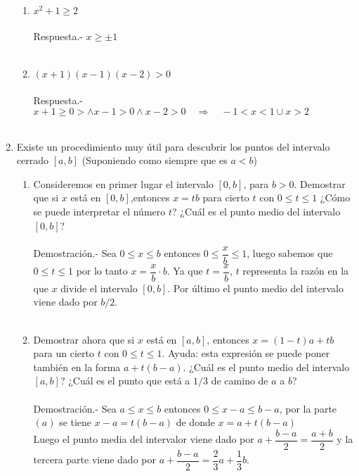 \begin{enumerate}
\begin{enumerate}[\bfseries (i)]
	\item $x^2+1 \geq 2$\\\\
	    Respuesta.-\; $x\geq \pm 1$\\\\

	\item $(x+1)(x-1)(x-2)>0$\\\\
	    Respuesta.-\; $x+1\geq 0 > \land x-1 > 0  \land x-2>0 \quad \Longrightarrow \quad -1<x<1 \cup x>2$\\\\

    \end{enumerate}

    \item Existe un procedimiento muy útil para descubrir los puntos del intervalo cerrado $[a,b]$ (Suponiendo como siempre que es $a<b$)
    \begin{enumerate}[\bfseries (a)]
	
	\item Consideremos en primer lugar el intervalo $[0,b]$, para $b>0$. Demostrar que si $x$ está en $[0,b]$,entonces $x=tb$ para cierto $t$ con $0\leq t \leq 1$ ¿Cómo se puede interpretar el número $t$? ¿Cuál es el punto medio del intervalo $[0,b]$?\\\\
	    Demostración.-\; Sea $0\leq x \leq b$ entonces $0\leq \dfrac{x}{b} \leq 1$, luego sabemos que $0\leq t \leq 1$ por lo tanto $x=\dfrac{x}{b}\cdot b$. Ya que $t=\dfrac{x}{b}$, $t$ representa la razón en la que $x$ divide el intervalo $[0,b]$. Por último el punto medio del intervalo viene dado por $b/2$.\\\\

	\item Demostrar ahora que si $x$ está en $[a,b]$, entonces $x=(1-t)a+tb$ para un cierto $t$ con $0\leq t \leq 1.$ Ayuda: esta expresión se puede poner también en la forma $a+t(b-a).$ ¿Cuál es el punto medio del intervalo $[a,b]$? ¿Cuál es el punto que está a $1/3$ de camino de $a$ a $b$?\\\\
	    Demostración.-\; Sea $a\leq x \leq b$ entonces $0\leq x-a \leq b-a$, por la parte $(a)$ se tiene  $x-a=t(b-a)$ de donde $x=a+t(b-a)$\\
	    Luego el punto media del intervalor viene dado por $a+\dfrac{b-a}{2}=\dfrac{a+b}{2}$ y la tercera parte viene dado por $a+\dfrac{b-a}{2}=\dfrac{2}{3}a + \dfrac{1}{3}b.$\\\\


\end{enumerate}
\end{enumerate}
